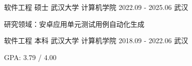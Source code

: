 

\begin{cventries}

  \cventry
    {软件工程 \quad 硕士} %
    {武汉大学 \quad 计算机学院} %
    {2022.09 - 2025.06} %
    {武汉} %
    {
      \begin{cvitems} %
        \item {研究领域：安卓应用单元测试用例自动化生成}
      \end{cvitems}
    }

  \cventry
    {软件工程 \quad 本科} %
    {武汉大学 \quad 计算机学院} %
    {2018.09 - 2022.06} %
    {武汉} %
    {
      \begin{cvitems} %
        \item {GPA: 3.79 / 4.00}
      \end{cvitems}
    }

\end{cventries}
